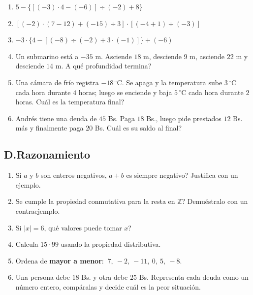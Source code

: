 \documentclass[12pt, letterpaper]{article}
\newcommand{\Z}{\mathbb{Z}}
\begin{document}
\begin{enumerate}[leftmargin=*, start=13]
  \item $5 - \{[(-3) \cdot 4 - (-6)] \div (-2) + 8\}$

  \item $[(-2) \cdot (7 - 12) + (-15) \div 3] \cdot [(-4 + 1) \div (-3)]$

  \item $-3 \cdot \{4 - [(-8) \div (-2) + 3 \cdot (-1)]\} + (-6)$

  \item Un submarino está a $-35$ m. Asciende $18$ m, desciende $9$ m, asciende $22$ m y desciende $14$ m. \textquestiondown A qué profundidad termina?

  \item Una cámara de frío registra $-18\,^{\circ}$C. Se apaga y la temperatura sube $3\,^{\circ}$C cada hora durante $4$ horas; luego se enciende y baja $5\,^{\circ}$C cada hora durante $2$ horas. \textquestiondown Cuál es la temperatura final?

  \item Andrés tiene una deuda de $45$ Bs. Paga $18$ Bs., luego pide prestados $12$ Bs. más y finalmente paga $20$ Bs. \textquestiondown Cuál es su saldo al final?
\end{enumerate}

\subsection*{D.\quad Razonamiento}

\begin{enumerate}[leftmargin=*, start=19]
  \item Si $a$ y $b$ son enteros negativos, \textquestiondown $a + b$ es siempre negativo? Justifica con un ejemplo.

  \item \textquestiondown Se cumple la propiedad conmutativa para la resta en $\Z$? Demuéstralo con un contraejemplo.

  \item Si $|x| = 6$, \textquestiondown qué valores puede tomar $x$?

  \item Calcula $15 \cdot 99$ usando la propiedad distributiva.

  \item Ordena de \textbf{mayor a menor}: $\ 7, \ -2, \ -11, \ 0, \ 5, \ -8$.

  \item Una persona debe $18$ Bs. y otra debe $25$ Bs. Representa cada deuda como un número entero, compáralas y decide cuál es la peor situación.
\end{enumerate}
\end{document}
